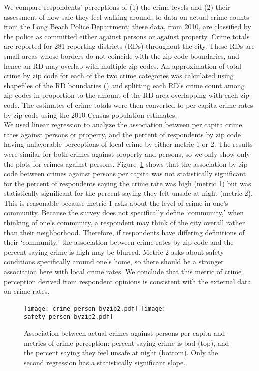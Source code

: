 We compare respondents' perceptions of (1) the crime levels and (2) their assessment of how safe they feel walking around, to data on actual crime counts from the Long Beach Police Department; these data, from 2010, are classified by the police as committed either against persons or against property.  Crime totals are reported for 281 reporting districts (RDs) throughout the city.  These RDs are small areas whose borders do not coincide with the zip code boundaries, and hence an RD may overlap with multiple zip codes.  An approximation of total crime by zip code for each of the two crime categories was calculated using shapefiles of the RD boundaries (\citealt{LBData}) and splitting each RD's crime count among zip codes in proportion to the amount of the RD area overlapping with each zip code. The estimates of crime totals were then converted to per capita crime rates by zip code using the 2010 Census population estimates.\\
\indent
We used linear regression to analyze the association between per capita crime rates against persons or property, and the percent of respondents by zip code having unfavorable perceptions of local crime by either metric 1 or 2.  The results were similar for both crimes against property and persons, so we only show only the plots for crimes against persons.  Figure~\ref{fig:crimereg} shows that the association by zip code between crimes against persons per capita was not statistically significant for the percent of respondents saying the crime rate was high (metric 1) but was statistically significant for the percent saying they felt unsafe at night (metric 2).  This is reasonable because metric 1 asks about the level of crime in one's community. Because the survey does not specifically define `community,' when thinking of one's community, a respondent may think of the city overall rather than their neighborhood.  Therefore, if respondents have differing definitions of their `community,' the association between crime rates by zip code and the percent saying crime is high may be blurred.  Metric 2 asks about safety conditions specifically around one's home, so there should be a stronger association here with local crime rates.  We conclude that this metric of crime perception derived from respondent opinions is consistent with the external data on crime rates.

\begin{figure}
\centering

  \texttt{[image: crime\_person\_byzip2.pdf]}
  \texttt{[image: safety\_person\_byzip2.pdf]}
  \caption{Association between actual crimes against persons per capita and metrics of crime perception: percent saying
  crime is bad (top), and the percent saying they feel unsafe at night (bottom).  Only the second regression has a statistically significant slope.}
  \label{fig:crimereg}    
\end{figure}

